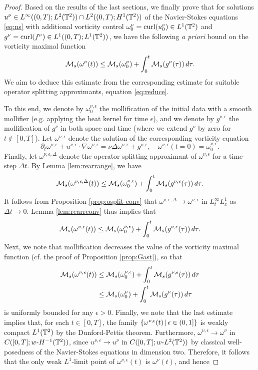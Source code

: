 \documentclass[reqno,12pt]{amsart}
\DeclareMathOperator{\curl}{curl}
\begin{document}
\begin{proof}
Based on the results of the last sections, we finally prove that for solutions $u^\nu \in L^\infty((0,T);L^2(\mathbb{T}^2))\cap L^2((0,T);H^1(\mathbb{T}^2))$ of the Navier-Stokes equations \eqref{eq:ns} with additional vorticity control $\omega_0^\nu = \curl(u^\nu_0) \in L^1(\T^2)$ and $g^\nu = \curl(f^\nu) \in L^1((0,T);L^1(\T^2))$, we have the following {\it a priori} bound on the vorticity maximal function
\[
\mathcal{M}_s(\omega^\nu(t))
\le
\mathcal{M}_s(\omega^\nu_0) + \int_0^t \mathcal{M}_s(g^\nu(\tau)) \, d\tau.
\]
We aim to deduce this estimate from the corresponding estimate for suitable operator splitting approximants, equation \eqref{eq:reduce}.

To this end, we denote by $\omega^{\nu,\epsilon}_0$ the mollification of the initial data with a smooth mollifier (e.g. applying the heat kernel for time $\epsilon$), and we denote by $g^{\nu,\epsilon}$ the mollification of $g^\nu$ in both space and time (where we extend $g^\nu$ by zero for $t\notin [0,T]$). Let $\omega^{\nu,\epsilon}$ denote the solution of the corresponding vorticity equation
\[
\partial_t \omega^{\nu,\epsilon} + u^{\nu,\epsilon} \cdot \nabla \omega^{\nu,\epsilon} = \nu \Delta \omega^{\nu,\epsilon} + g^{\nu,\epsilon},
\quad
\omega^{\nu,\epsilon}(t=0) = \omega^{\nu,\epsilon}_0.
\]
Finally, let $\omega^{\nu,\epsilon,\Delta}$ denote the operator splitting approximant of $\omega^{\nu,\epsilon}$ for a time-step $\Delta t$. By Lemma \ref{lem:rearrange}, we have
\[
\mathcal{M}_s(\omega^{\nu,\epsilon,\Delta}(t))
\le
\mathcal{M}_s(\omega^{\nu,\epsilon}_0)
+
\int_0^t \mathcal{M}_s(g^{\nu,\epsilon}(\tau)) \, d\tau.
\]
It follows from Proposition \ref{prop:osplit-conv} that $\omega^{\nu,\epsilon,\Delta} {\to} \omega^{\nu,\epsilon}$ in $L^\infty_tL^1_x$ as $\Delta t\to 0$. Lemma \ref{lem:rearrconv} thus implies that
\[
\mathcal{M}_s(\omega^{\nu,\epsilon}(t))
\le
\mathcal{M}_s(\omega^{\nu,\epsilon}_0)
+
\int_0^t \mathcal{M}_s(g^{\nu,\epsilon}(\tau)) \, d\tau.
\]
Next, we note that mollification decreases the value of the vorticity maximal function (cf. the proof of Proposition \ref{prop:Gast}), so that
\begin{gather}
\label{eq:msbd11}
\begin{aligned}
\mathcal{M}_s(\omega^{\nu,\epsilon}(t))
&\le
\mathcal{M}_s(\omega^{\nu,\epsilon}_0)
+
\int_0^t \mathcal{M}_s(g^{\nu,\epsilon}(\tau)) \, d\tau
\\
&\le
\mathcal{M}_s(\omega^{\nu}_0)
+
\int_0^t \mathcal{M}_s(g^{\nu}(\tau)) \, d\tau
\end{aligned}
\end{gather}
is uniformly bounded for any $\epsilon > 0$. Finally, we note that the last estimate implies that, for each $t \in [0,T]$, the family ${\left\{ \omega^{\nu,\epsilon}(t) \,\middle|\, \epsilon \in (0,1] \right\}}$ is weakly compact $L^1(\mathbb{T}^2)$ by the Dunford-Pettis theorem. Furthermore, $\omega^{\nu,\epsilon} \to \omega^{\nu}$ in $C([0,T];w\text{-}H^{-1}(\mathbb{T}^2))$, since $u^{\nu,\epsilon}\to u^\nu$ in $C([0,T];w\text{-}L^2(\mathbb{T}^2))$ by classical well-posedness of the Navier-Stokes equations in dimension two. Therefore, it follows that the only weak $L^1$-limit point of $\omega^{\nu,\epsilon}(t)$ is $\omega^\nu(t)$, and hence

\end{proof}
\end{document}
